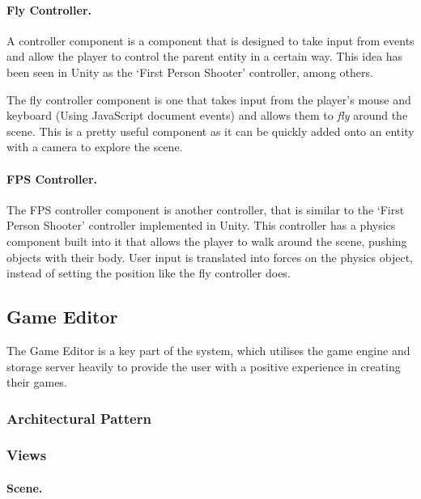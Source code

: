	\paragraph{Fly Controller.}
	A controller component is a component that is designed to take input from events and allow the player to control the parent entity in a certain way. This idea has been seen in Unity as the `First Person Shooter' controller, among others.

	The fly controller component is one that takes input from the player's mouse and keyboard (Using JavaScript document events) and allows them to \emph{fly} around the scene. This is a pretty useful component as it can be quickly added onto an entity with a camera to explore the scene.

	\paragraph{FPS Controller.}
	The FPS controller component is another controller, that is similar to the `First Person Shooter' controller implemented in Unity. This controller has a physics component built into it that allows the player to walk around the scene, pushing  objects with their body. User input is translated into forces on the physics object, instead of setting the position like the fly controller does.

	\subsection{Game Editor}
	\label{subsection:gameeditor}
	The Game Editor is a key part of the system, which utilises the game engine and storage server heavily to provide the user with a positive experience in creating their games.
	
	\subsubsection{Architectural Pattern}
	\subsubsection{Views}
	\paragraph{Scene.}
